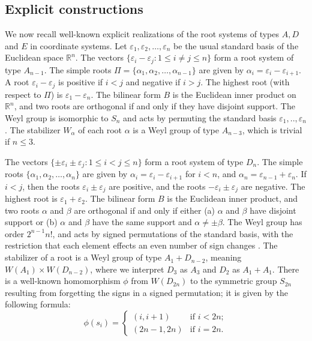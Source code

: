 \documentclass[11pt]{amsart}
\theoremstyle{plain}
\theoremstyle{definition}
\theoremstyle{remark}
\numberwithin{equation}{subsection}
\newcommand{\al}{\alpha}
\newcommand{\be}{\beta}
\newcommand{\ep}{\varepsilon}
\newcommand{\R}{{\mathbb R}}
\begin{document}
\subsection{Explicit constructions}
\label{sec:constructions}

We now recall well-known explicit realizations of the root systems of types
$A,D$ and $E$ in coordinate systems. Let $\ep_1, \ep_2, \ldots, \ep_n$ be the
usual standard basis of the Euclidean space $\R^n$.  The vectors $\{\ep_i - \ep_j : 1 \leq i \ne j
\leq n\}$ form a root system of type $A_{n-1}$.  The simple roots $\Pi=\{\al_1,
\al_2, \ldots, \al_{n-1}\}$ are given by $\al_i = \ep_i - \ep_{i+1}$.  A root
$\ep_i - \ep_j$ is positive if $i < j$ and negative if $i > j$.  The highest
root (with respect to $\Pi$) is $\ep_1 - \ep_n$.  The bilinear form $B$ is the
Euclidean inner product on $\R^n$, and two roots are orthogonal if and only if they have
disjoint support. The Weyl group is isomorphic to $S_n$ and acts by permuting
the standard basis $\ep_1,..,\ep_n$.  The stabilizer $W_\al$ of each root
$\al$ is a Weyl group of type $A_{n-3}$, which is trivial if $n \leq 3$.

The vectors $\{\pm\ep_i \pm \ep_j : 1 \leq i < j \leq n\}$ form a root system of
type $D_n$.  The simple roots $\{\al_1, \al_2, \ldots, \al_n\}$ are given by
$\al_i = \ep_i - \ep_{i+1}$ for $i < n$, and $\al_n = \ep_{n-1} + \ep_{n}$. If $i
< j$, then the roots $\ep_i \pm \ep_j$ are positive, and the roots $-\ep_i \pm
\ep_j$ are negative. The highest root is $\ep_1 + \ep_2$.  The bilinear form $B$
is the Euclidean inner product, and two roots $\al$ and $\be$ are orthogonal if and
only if either (a) $\al$ and $\be$ have disjoint support or (b) $\al$ and $\be$
have the same support and $\al \ne \pm \be$.  The Weyl group has order
$2^{n-1}n!$, and acts by signed permutations of the standard basis, with the
restriction that each element effects an even number of sign changes
\cite[Section 2.10]{humphreys90}.  The stabilizer of a root is a Weyl group of
type $A_1 + D_{n-2}$, meaning $W(A_1) \times W(D_{n-2})$, where we interpret
$D_3$ as $A_3$ and $D_2$ as $A_1 + A_1$.  There is a well-known homomorphism
$\phi$ from $W(D_{2n})$ to the symmetric group $S_{2n}$ resulting from
forgetting the signs in a signed permutation; it is given by the following
formula:
\begin{equation}
    \label{eq:phimap} \phi(s_i) = \begin{cases} (i, i+1) & \text{if\ } i < 2n;\\
    (2n-1, 2n) & \text{if } i=2n.
      \end{cases}
  \end{equation}
\end{document}
